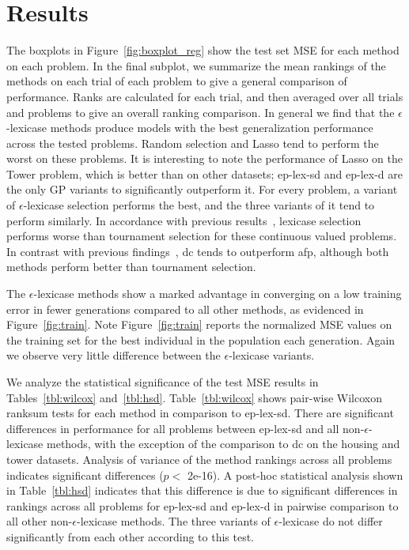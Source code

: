 \documentclass[twoside]{article}
\begin{document}
\section{Results}\label{s:results}
The boxplots in Figure~\ref{fig:boxplot_reg} show the test set MSE for each method on each problem. In the final subplot, we summarize the mean rankings of the methods on each trial of each problem to give a general comparison of performance. Ranks are calculated for each trial, and then averaged over all trials and problems to give an overall ranking comparison. In general we find that the $\epsilon$-lexicase methods produce models with the best generalization performance across the tested problems. Random selection and Lasso tend to perform the worst on these problems. It is interesting to note the performance of Lasso on the Tower problem, which is better than on other datasets; ep-lex-sd and ep-lex-d are the only GP variants to significantly outperform it. For every problem, a variant of $\epsilon$-lexicase selection performs the best, and the three variants of it tend to perform similarly. In accordance with previous results~\citep{la_cava_epsilon-lexicase_2016}, lexicase selection performs worse than tournament selection for these continuous valued problems. In contrast with previous findings~\citep{schmidt_age-fitness_2011}, dc tends to outperform afp, although both methods perform better than tournament selection. 

The $\epsilon$-lexicase methods show a marked advantage in converging on a low training error in fewer generations compared to all other methods, as evidenced in Figure~\ref{fig:train}. Note Figure~\ref{fig:train} reports the normalized MSE values on the training set for the best individual in the population each generation. Again we observe very little difference between the $\epsilon$-lexicase variants. 

We analyze the statistical significance of the test MSE results in Tables~\ref{tbl:wilcox} and~\ref{tbl:hsd}. Table~\ref{tbl:wilcox} shows pair-wise Wilcoxon ranksum tests for each method in comparison to ep-lex-sd. There are significant differences in performance for all problems between ep-lex-sd and all non-$\epsilon$-lexicase methods, with the exception of the comparison to dc on the housing and tower datasets. Analysis of variance of the method rankings across all problems indicates significant differences ($p<$ 2e-16). A post-hoc statistical analysis shown in Table~\ref{tbl:hsd} indicates that this difference is due to significant differences in rankings across all problems for ep-lex-sd and ep-lex-d in pairwise comparison to all other non-$\epsilon$-lexicase methods. The three variants of $\epsilon$-lexicase do not differ significantly from each other according to this test.
\end{document}

